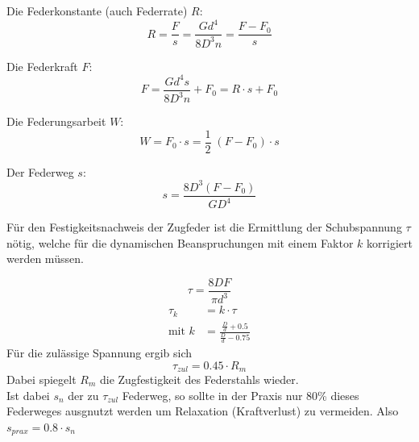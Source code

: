 Die Federkonstante (auch Federrate) $R$:
\begin{equation}
    R=\frac{F}{s}=\frac{Gd^4}{8D^3n}=\frac{F-F_0}{s}
    \label{eqn:federrate}
\end{equation}

Die Federkraft $F$:
\begin{equation}
    F=\frac{Gd^4s}{8D^3n}+F_0=R \cdot s +F_0
    \label{eqn:federkraft}
\end{equation}

Die Federungsarbeit $W$:
\begin{equation}
    W=F_0 \cdot s = \frac{1}{2}\;(F-F_0) \cdot s
    \label{eqn:federungsarbeit}
\end{equation}

Der Federweg $s$:
\begin{equation}
    s=\frac{8D^3(F-F_0)}{GD^4}
    \label{eqn:federweg}
\end{equation}
\newline




Für den Festigkeitsnachweis der Zugfeder ist die Ermittlung der Schubspannung $\tau$
nötig, welche für die dynamischen Beanspruchungen mit einem Faktor $k$ korrigiert werden müssen.

\begin{equation}
    \tau = \frac{8DF}{\pi d^3}
    \label{eqn:schubspannung}
\end{equation}
\begin{align}
    \tau_k &= k \cdot \tau\\
    \text{mit }k&=\frac{\frac{D}{d}+0.5}{\frac{D}{d}-0.75}
\end{align}
Für die zulässige Spannung ergib sich
\begin{equation}
    \tau_{zul}=0.45 \cdot R_m
\end{equation}
Dabei spiegelt $R_m$ die Zugfestigkeit des Federstahls wieder.\\
Ist dabei $s_n$ der zu $\tau_{zul}$ Federweg, so sollte in der Praxis nur 80\% dieses
Federweges ausgnutzt werden um Relaxation (Kraftverlust) zu vermeiden.
Also $s_{prax}=0.8 \cdot s_n$  



\label{sec:theorie}